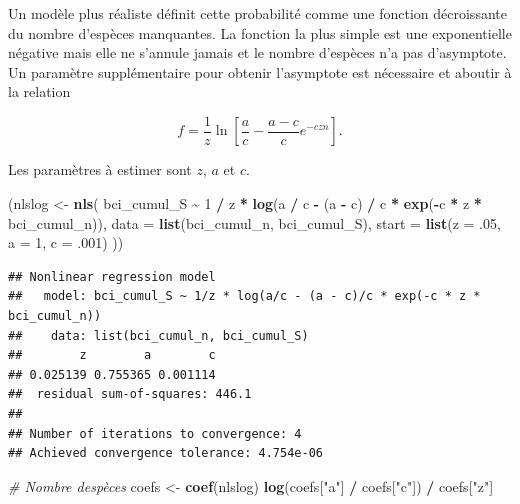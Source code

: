 \documentclass[
  11pt,
  american,
  a4paper,
  extrafontsizes,onecolumn,openright
  ]{memoir}
\newenvironment{Shaded}{\begin{snugshade}}{\end{snugshade}}
\newcommand{\AttributeTok}[1]{\textcolor[rgb]{0.13,0.29,0.53}{#1}}
\newcommand{\CommentTok}[1]{\textcolor[rgb]{0.56,0.35,0.01}{\textit{#1}}}
\newcommand{\DecValTok}[1]{\textcolor[rgb]{0.00,0.00,0.81}{#1}}
\newcommand{\FunctionTok}[1]{\textcolor[rgb]{0.13,0.29,0.53}{\textbf{#1}}}
\newcommand{\NormalTok}[1]{#1}
\newcommand{\OtherTok}[1]{\textcolor[rgb]{0.56,0.35,0.01}{#1}}
\newcommand{\SpecialCharTok}[1]{\textcolor[rgb]{0.81,0.36,0.00}{\textbf{#1}}}
\newcommand{\StringTok}[1]{\textcolor[rgb]{0.31,0.60,0.02}{#1}}
\begin{document}
Un modèle plus réaliste définit cette probabilité comme une fonction décroissante du nombre d'espèces manquantes.
La fonction la plus simple est une exponentielle négative mais elle ne s'annule jamais et le nombre d'espèces n'a pas d'asymptote.
Un paramètre supplémentaire pour obtenir l'asymptote est nécessaire et aboutir à la relation

\begin{equation} 
  \label{eq:Soberon1993b}
  f = \frac{1}{z} \ln \left[ \frac{a}{c} - \frac{a-c}{c} e^{-czn} \right].
\end{equation}

Les paramètres à estimer sont \(z\), \(a\) et \(c\).

\scriptsize

\begin{Shaded}
\begin{Highlighting}[]
\NormalTok{(nlslog }\OtherTok{\textless{}{-}} \FunctionTok{nls}\NormalTok{(}
\NormalTok{  bci\_cumul\_S }\SpecialCharTok{\textasciitilde{}} \DecValTok{1} \SpecialCharTok{/}\NormalTok{ z }\SpecialCharTok{*} \FunctionTok{log}\NormalTok{(a }\SpecialCharTok{/}\NormalTok{ c }\SpecialCharTok{{-}}\NormalTok{ (a }\SpecialCharTok{{-}}\NormalTok{ c) }\SpecialCharTok{/}\NormalTok{ c }\SpecialCharTok{*} \FunctionTok{exp}\NormalTok{(}\SpecialCharTok{{-}}\NormalTok{c }\SpecialCharTok{*}\NormalTok{ z }\SpecialCharTok{*}\NormalTok{ bci\_cumul\_n)), }
  \AttributeTok{data =} \FunctionTok{list}\NormalTok{(bci\_cumul\_n, bci\_cumul\_S), }
  \AttributeTok{start =} \FunctionTok{list}\NormalTok{(}\AttributeTok{z =}\NormalTok{ .}\DecValTok{05}\NormalTok{, }\AttributeTok{a =} \DecValTok{1}\NormalTok{, }\AttributeTok{c =}\NormalTok{ .}\DecValTok{001}\NormalTok{)}
\NormalTok{))}
\end{Highlighting}
\end{Shaded}

\begin{verbatim}
## Nonlinear regression model
##   model: bci_cumul_S ~ 1/z * log(a/c - (a - c)/c * exp(-c * z * bci_cumul_n))
##    data: list(bci_cumul_n, bci_cumul_S)
##        z        a        c 
## 0.025139 0.755365 0.001114 
##  residual sum-of-squares: 446.1
## 
## Number of iterations to convergence: 4 
## Achieved convergence tolerance: 4.754e-06
\end{verbatim}

\begin{Shaded}
\begin{Highlighting}[]
\CommentTok{\# Nombre d\textquotesingle{}espèces}
\NormalTok{coefs }\OtherTok{\textless{}{-}} \FunctionTok{coef}\NormalTok{(nlslog)}
\FunctionTok{log}\NormalTok{(coefs[}\StringTok{"a"}\NormalTok{] }\SpecialCharTok{/}\NormalTok{ coefs[}\StringTok{"c"}\NormalTok{]) }\SpecialCharTok{/}\NormalTok{ coefs[}\StringTok{"z"}\NormalTok{]}
\end{Highlighting}
\end{Shaded}
\end{document}
